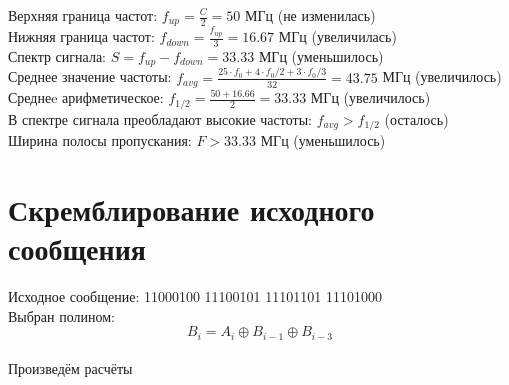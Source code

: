 \documentclass{article}
\begin{document}
Верхняя граница частот: $f_{up} = \frac{C}{2} = 50$ МГц (не изменилась)
\\
Нижняя граница частот: $f_{down} = \frac{f_{up}}{3} = 16.67$ МГц (увеличилась)
\\
Спектр сигнала: $S = f_{up} - f_{down} = 33.33$ МГц (уменьшилось)
\\
Среднее значение частоты: $f_{avg} = \frac{25\cdot f_0 + 4\cdot f_0/2 + 3\cdot f_0/3}{32} = 43.75$ МГц (увеличилось)
\\
Среднеe арифметическое: $f_{1/2} = \frac{50 + 16.66}{2} = 33.33$ МГц (увеличилось)
\\
В спектре сигнала преобладают высокие частоты: $f_{avg} > f_{1/2}$ (осталось)
\\
Ширина полосы пропускания: $F > 33.33$ МГц (уменьшилось)

\section{Скремблирование исходного сообщения}
Исходное сообщение: 11000100 11100101 11101101 11101000
\\
Выбран полином:
\[B_i = A_i \oplus B_{i-1} \oplus B_{i-3}\]
\\
Произведём расчёты
\end{document}
